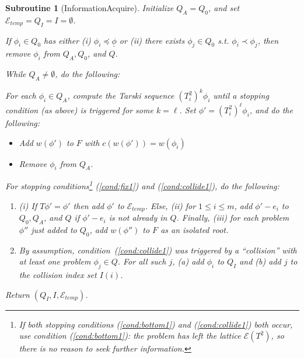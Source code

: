 \documentclass[11pt,reqno]{amsart}
\newtheorem{subroutine}[thm]{Subroutine}
\theoremstyle{definition}
\numberwithin{equation}{section}
\newcommand{\ul}{\underline}
\newcommand{\pre}{\phi}
\newcommand{\fix}{\mathcal{E}}
\newcommand{\peq}{\preceq}
\newcommand{\pe}{\prec}
\newcommand{\bopre}{\ul{\pre}}
\newcommand{\acto}{Q_0}
\newcommand{\acta}{Q_A}
\newcommand{\actc}{Q_I}
\newcommand{\act}{Q}
\newcommand{\coll}{I}
\newcommand{\forest}{F}
\newcommand{\fixtemp}{\mathcal{E}_{temp}}
\begin{document}
\begin{subroutine}[InformationAcquire] \label{sub:infac}
Initialize $\acta = \acto$, and set $\fixtemp = \actc = \coll = \emptyset$.

If $\pre_i \in \acto$ has either (i) $\pre_i \peq \bopre$ or (ii) there exists $\pre_j \in \acto$ s.t. $\pre_i \pe \pre_j$, then remove $\pre_i$ from $\acta, \acto$, and $\act$.

While $\acta \not = \emptyset$, do the following:

For each $\pre_i \in \acta$, compute the Tarski sequence $(T_i^2)^k \pre_i$ until a stopping condition (as above) is triggered for some $k = \ell$. 
Set $\pre' = (T_i^2)^{\ell}\pre_i$, and do the following:
\begin{itemize}
\item[(a)] Add $w(\pre')$ to $\forest$ with $c(w(\pre')) = w(\pre_i)$ 
\item[(b)] Remove $\pre_i$ from $\acta$. 
\end{itemize}
For stopping conditions\footnote{If both stopping conditions (\ref{cond:bottom1}) and (\ref{cond:collide1}) both occur, use condition (\ref{cond:bottom1}): the problem has left the lattice $\fix(T^2)$, so there is no reason to seek further information.} (\ref{cond:fix1}) and (\ref{cond:collide1}), do the following:
\begin{enumerate}
\item[(\ref{cond:fix1})] (i) If $T \pre' = \pre'$ then add $\pre'$ to $\fixtemp$. 
Else, (ii) for $1 \leq i \leq m$, add $\pre' - e_i$ to $\acto, \acta$, and $\act$ if $\pre' - e_i$ is not already in $\act$.
Finally, (iii) for each problem $\pre''$ just added to $\acto$, add $w(\pre'')$ to $\forest$ as an isolated root.
\item[(\ref{cond:collide1})] By assumption, condition~(\ref{cond:collide1}) was triggered by a ``collision'' with at least one problem $\pre_j \in \act$.
For all such $j$, (a) add $\pre_i$ to $\actc$ and (b) add $j$ to the collision index set $\coll(i)$. 
\end{enumerate}

Return $(\actc, \coll, \fixtemp)$.
\end{subroutine}

\end{document}
